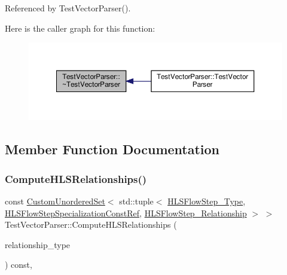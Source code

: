 Referenced by Test\+Vector\+Parser().

Here is the caller graph for this function\+:
\nopagebreak
\begin{figure}[H]
\begin{center}
\leavevmode
\includegraphics[width=350pt]{d8/d4e/classTestVectorParser_a517254f8072a45d179287ebb6125fef7_icgraph}
\end{center}
\end{figure}


\subsection{Member Function Documentation}
\mbox{\label{classTestVectorParser_a5aff1be837995418f60502e97b03f363}} 
\subsubsection{\texorpdfstring{Compute\+H\+L\+S\+Relationships()}{ComputeHLSRelationships()}}
{\footnotesize\ttfamily const \hyperlink{classCustomUnorderedSet}{Custom\+Unordered\+Set}$<$ std\+::tuple$<$ \hyperlink{hls__step_8hpp_ada16bc22905016180e26fc7e39537f8d}{H\+L\+S\+Flow\+Step\+\_\+\+Type}, \hyperlink{hls__step_8hpp_a5fdd2edf290c196531d21d68e13f0e74}{H\+L\+S\+Flow\+Step\+Specialization\+Const\+Ref}, \hyperlink{hls__step_8hpp_a3ad360b9b11e6bf0683d5562a0ceb169}{H\+L\+S\+Flow\+Step\+\_\+\+Relationship} $>$ $>$ Test\+Vector\+Parser\+::\+Compute\+H\+L\+S\+Relationships (\begin{DoxyParamCaption}\item[{const \hyperlink{classDesignFlowStep_a723a3baf19ff2ceb77bc13e099d0b1b7}{Design\+Flow\+Step\+::\+Relationship\+Type}}]{relationship\+\_\+type }\end{DoxyParamCaption}) const\hspace{0.3cm}{\ttfamily [override]}, {\ttfamily [virtual]}}



